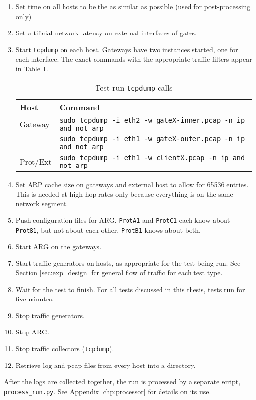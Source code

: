 \begin{enumerate}
\item Set time on all hosts to be the as similar as possible (used for post-processing only).
\item Set artificial network latency on external interfaces of gates.
\item Start \texttt{tcpdump} on each host. Gateways have two instances started, one for each interface. The exact commands with the appropriate traffic filters appear in Table \ref{tbl:test_tcpdump_calls}.
\begin{table}
\caption{Test run \texttt{tcpdump} calls}
\label{tbl:test_tcpdump_calls}
\centering
\begin{tabular}{l|l}
Host & Command\\
\hline
Gateway & \texttt{sudo tcpdump -i eth2 -w gateX-inner.pcap -n ip and not arp}\\
	& \texttt{sudo tcpdump -i eth1 -w gateX-outer.pcap -n ip and not arp}\\
\hline
Prot/Ext & \texttt{sudo tcpdump -i eth1 -w clientX.pcap -n ip and not arp}
\end{tabular}
\end{table}

\item Set \ac{ARP} cache size on gateways and external host to allow for 65536 entries. This is needed at high hop rates only because everything is on the same network segment.
\item Push configuration files for \ac{ARG}. \texttt{ProtA1} and \texttt{ProtC1} each know about \texttt{ProtB1}, but not about each other. \texttt{ProtB1} knows about both.
\item Start \ac{ARG} on the gateways. 
\item Start traffic generators on hosts, as appropriate for the test being run. See Section \ref{sec:exp_design} for general flow of traffic for each test type.
\item Wait for the test to finish. For all tests discussed in this thesis, tests run for five minutes.
\item Stop traffic generators.
\item Stop \ac{ARG}.
\item Stop traffic collectors (\texttt{tcpdump}).
\item Retrieve log and pcap files from every host into a directory.
\end{enumerate}

\par After the logs are collected together, the run is processed by a separate script, \texttt{process\_run.py}. See Appendix \ref{chp:processor} for details on its use. 

